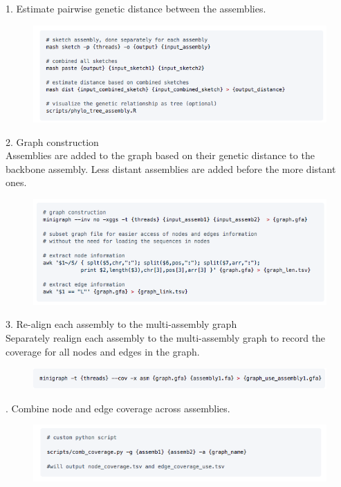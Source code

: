 \documentclass[../main.tex]{subfiles}
\begin{document}
\begin{flushleft}
1. Estimate pairwise genetic distance between the assemblies. \\
    \begin{figure}[!htb]
        \centering
        \includegraphics[width=\textwidth]{paper3/supplement/sp421.png}
    \end{figure}
2. Graph construction \\ Assemblies are added to the graph based on their genetic distance to the backbone assembly. Less distant assemblies are added before the more distant ones. \\
    \begin{figure}[!htb]
        \centering
        \includegraphics[width=\textwidth]{paper3/supplement/sp422.png}
    \end{figure}
3. Re-align each assembly to the multi-assembly graph \\ Separately realign each assembly to the multi-assembly graph to record the coverage for all nodes and edges in the graph. \\
    \begin{figure}[!htb]
        \centering
        \includegraphics[width=\textwidth]{paper3/supplement/sp423.png}
    \end{figure}
    . Combine node and edge coverage across assemblies. \\
    \begin{figure}[!htb]
        \centering
        \includegraphics[width=\textwidth]{paper3/supplement/sp424.png}

\end{figure}
\end{flushleft}
\end{document}

